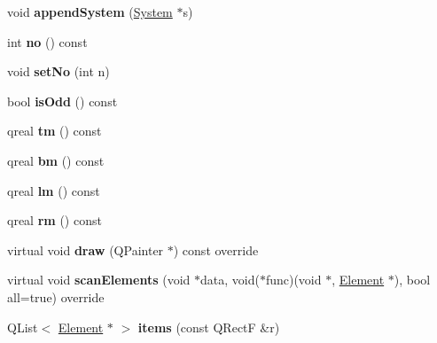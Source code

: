 \begin{DoxyCompactItemize}
\mbox{\label{class_ms_1_1_page_af6950752da3fa7a2850353dc5ef7dc03}} 
void {\bfseries append\+System} (\hyperlink{class_ms_1_1_system}{System} $\ast$s)
\item 
\mbox{\label{class_ms_1_1_page_a25207ac5f6917524353db8610fd21b59}} 
int {\bfseries no} () const
\item 
\mbox{\label{class_ms_1_1_page_a6dc97c4788e7340735fa0c76f3d82876}} 
void {\bfseries set\+No} (int n)
\item 
\mbox{\label{class_ms_1_1_page_a6934d6b54adc4e7067e8fe8c164666d8}} 
bool {\bfseries is\+Odd} () const
\item 
\mbox{\label{class_ms_1_1_page_ae2b9fe5afb7ac2edd332ecb5153dfa9c}} 
qreal {\bfseries tm} () const
\item 
\mbox{\label{class_ms_1_1_page_a41815bd8cbedb3095e5c15ce2521100e}} 
qreal {\bfseries bm} () const
\item 
\mbox{\label{class_ms_1_1_page_a02e19503eda7f2d55ff4c660353636b9}} 
qreal {\bfseries lm} () const
\item 
\mbox{\label{class_ms_1_1_page_a573449f2e87eb5e24725579adb4c6a7d}} 
qreal {\bfseries rm} () const
\item 
\mbox{\label{class_ms_1_1_page_abe18029bdaaf1edff28e4e42bece9a29}} 
virtual void {\bfseries draw} (Q\+Painter $\ast$) const override
\item 
\mbox{\label{class_ms_1_1_page_a1fd565683ac35dd6ed04733ffc076c6b}} 
virtual void {\bfseries scan\+Elements} (void $\ast$data, void($\ast$func)(void $\ast$, \hyperlink{class_ms_1_1_element}{Element} $\ast$), bool all=true) override
\item 
\mbox{\label{class_ms_1_1_page_aeff943676e2284324b161831ac8d96dc}} 
Q\+List$<$ \hyperlink{class_ms_1_1_element}{Element} $\ast$ $>$ {\bfseries items} (const Q\+RectF \&r)
\item 

\end{DoxyCompactItemize}
